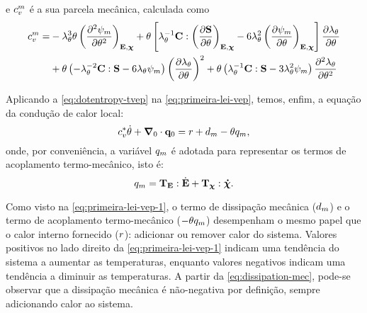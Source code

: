 \documentclass[Tese.tex]{subfiles}
\begin{document}
e $c_v^m$ é a sua parcela mecânica, calculada como
\begin{equation}
\begin{aligned}
c_v^m = &-\lambda_{\theta}^3\theta\left(\dfrac{\partial^2\psi_m}{\partial\theta^2}\right)_{\mathbf{E},\boldsymbol{\chi}} + \theta\left[\lambda_{\theta}^{-1}\mathbf{C}:\left(\dfrac{\partial\mathbf{S}}{\partial\theta}\right)_{\mathbf{E},\boldsymbol{\chi}} - 6\lambda_{\theta}^2\left(\dfrac{\partial\psi_m}{\partial\theta}\right)_{\mathbf{E},\boldsymbol{\chi}}\right]\dfrac{\partial\lambda_{\theta}}{\partial\theta} \\
&+\theta\left(-\lambda_{\theta}^{-2}\mathbf{C}:\mathbf{S}-6\lambda_{\theta}\psi_m\right)\left(\dfrac{\partial\lambda_{\theta}}{\partial\theta}\right)^2 + \theta\left(\lambda_{\theta}^{-1}\mathbf{C}:\mathbf{S} - 3\lambda_{\theta}^2\psi_m\right)\dfrac{\partial^2\lambda_{\theta}}{\partial\theta^2}
\end{aligned}
\end{equation}

Aplicando a \cref{eq:dotentropy-tvep} na \cref{eq:primeira-lei-vep}, temos, enfim, a equação da condução de calor local:
\begin{equation}\label{eq:primeira-lei-vep-1}
	c_v^{*}\dot{\theta} + \boldsymbol{\nabla}_0\cdot\mathbf{q}_0 = r + d_{m} - \theta q_m,
\end{equation}
onde, por conveniência, a variável $q_m$ é adotada para representar os termos de acoplamento termo-mecânico, isto é:
\begin{equation}
q_m = \mathbf{T}_{\mathbf{E}}:\dot{\mathbf{E}} + \mathbf{T}_{\boldsymbol{\chi}}:\boldsymbol{\dot{\chi}}.
\end{equation}

Como visto na \cref{eq:primeira-lei-vep-1}, o termo de dissipação mecânica ($d_{m}$) e o termo de acoplamento termo-mecânico ($-\theta q_m$) desempenham o mesmo papel que o calor interno fornecido ($r$): adicionar ou remover calor do sistema. Valores positivos no lado direito da \cref{eq:primeira-lei-vep-1} indicam uma tendência do sistema a aumentar as temperaturas, enquanto valores negativos indicam uma tendência a diminuir as temperaturas. A partir da \cref{eq:dissipation-mec}, pode-se observar que a dissipação mecânica é não-negativa por definição, sempre adicionando calor ao sistema.
\end{document}
